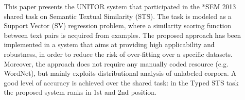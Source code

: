 This paper presents the UNITOR system that participated in the *SEM 2013 shared task on Semantic Textual Similarity (STS). The task is modeled as a Support
 Vector (SV) regression problem, where a similarity scoring function between
 text pairs is acquired from examples. The proposed approach has been
 implemented in a system that aims at providing high applicability and
 robustness, in order to reduce the risk of over-fitting over a specific
 datasets. Moreover, the approach does not require any manually coded resource
 (e.g. WordNet), but mainly exploits distributional analysis of unlabeled
 corpora. A good level of accuracy is achieved over the shared task: in the
 Typed STS task the proposed system ranks in 1st and 2nd position.

